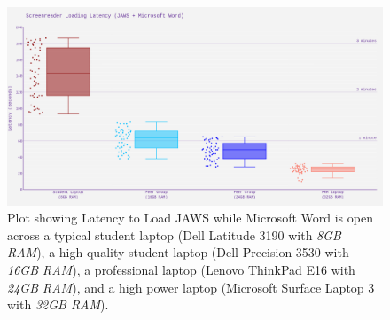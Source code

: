 \documentclass[12pt,letterpaper,twoside]{extreport}
\begin{document}
\begin{figure}[H]
	\centering
	\includegraphics[width=\textwidth]{images/ComputerRBDisplaySpecsTVIFig1.png}

	\caption[Latency to Load JAWS]{Plot showing Latency to Load JAWS while Microsoft Word is open across a typical student laptop (Dell Latitude 3190 with \textit{8GB RAM}), a high quality student laptop (Dell Precision 3530 with \textit{16GB RAM}), a professional laptop (Lenovo ThinkPad E16 with \textit{24GB RAM}), and a high power laptop (Microsoft Surface Laptop 3 with \textit{32GB RAM}).}\label{fig:figure 1}
\end{figure}
\end{document}
